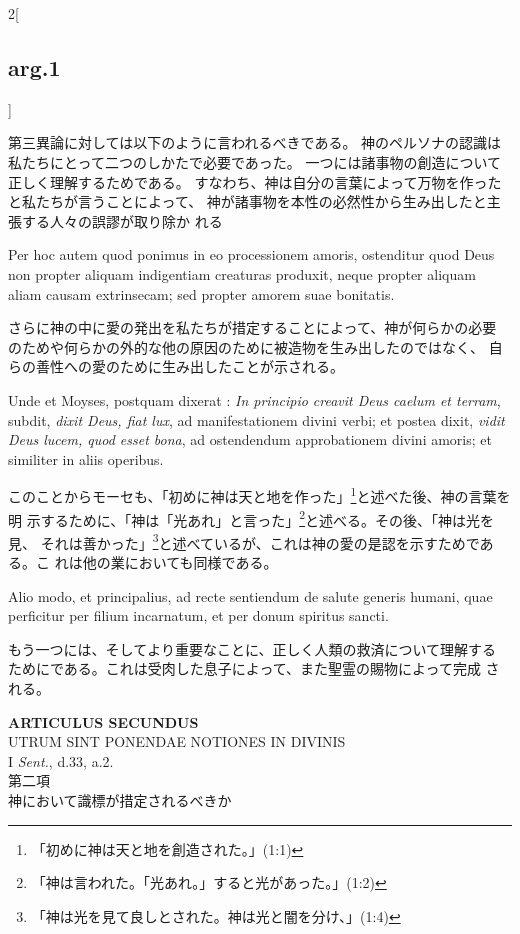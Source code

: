 \documentclass[paper=a4paper,fontsize=10pt,jafontsize=9pt,titlepage]{jlreq}
\begin{document}
\begin{paracol}{2}[\subsection{arg.1}]
\switchcolumn

第三異論に対しては以下のように言われるべきである。
神のペルソナの認識は私たちにとって二つのしかたで必要であった。
一つには諸事物の創造について正しく理解するためである。
すなわち、神は自分の言葉によって万物を作ったと私たちが言うことによって、
 神が諸事物を本性の必然性から生み出したと主張する人々の誤謬が取り除か
 れる

\switchcolumn*

Per hoc autem quod ponimus in eo processionem amoris,
ostenditur quod Deus non propter aliquam indigentiam creaturas
produxit, neque propter aliquam aliam causam extrinsecam; sed propter
amorem suae bonitatis.

\switchcolumn

さらに神の中に愛の発出を私たちが措定することによって、神が何らかの必要
 のためや何らかの外的な他の原因のために被造物を生み出したのではなく、
 自らの善性への愛のために生み出したことが示される。

\switchcolumn*

Unde et Moyses, postquam dixerat : {\itshape In principio
creavit Deus caelum et terram}, subdit, {\itshape dixit Deus, fiat lux}, ad
manifestationem divini verbi; et postea dixit, {\itshape vidit Deus lucem, quod
esset bona}, ad ostendendum approbationem divini amoris; et similiter
in aliis operibus.

\switchcolumn

このことからモーセも、「初めに神は天と地を作った」\footnote{「初めに神は天と地を創造された。」(1:1)}と述べた後、神の言葉を明
 示するために、「神は「光あれ」と言った」\footnote{「神は言われた。「光あれ。」すると光があった。」(1:2)}と述べる。その後、「神は光を見、
 それは善かった」\footnote{「神は光を見て良しとされた。神は光と闇を分け、」(1:4)}と述べているが、これは神の愛の是認を示すためである。こ
 れは他の業においても同様である。

\switchcolumn*

Alio modo, et principalius, ad recte sentiendum de
salute generis humani, quae perficitur per filium incarnatum, et per
donum spiritus sancti.

\switchcolumn

もう一つには、そしてより重要なことに、正しく人類の救済について理解する
 ためにである。これは受肉した息子によって、また聖霊の賜物によって完成
 される。

\end{paracol}
\newpage


\begin{center}
{\Large {\bfseries ARTICULUS SECUNDUS}}\\
{\large UTRUM SINT PONENDAE NOTIONES IN DIVINIS}\\
{\footnotesize I {\itshape Sent.}, d.33, a.2.}\\
{\Large 第二項\\神において識標が措定されるべきか}
\end{center}
\end{document}
